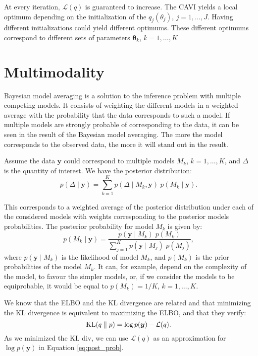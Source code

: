 \documentclass{article}
\numberwithin{equation}{section}
\DeclareMathOperator*{\KL}{{\rm KL}}
\begin{document}
At every iteration, $\mathcal{L}(q)$ is guaranteed to increase. The CAVI yields a local optimum depending on the initialization of the $q_j(\theta_j)$, $j=1,\ldots,J$. Having different initializations could yield different optimums. These different optimums correspond to different sets of parameters $\boldsymbol{\theta}_k$, $k=1,\ldots,K$

\section{Multimodality}

Bayesian model averaging is a solution to the inference problem with multiple competing models. It consists of weighting the different models in a weighted average with the probability that the data corresponds to such a model. If multiple models are strongly probable of corresponding to the data, it can be seen in the result of the Bayesian model averaging. The more the model corresponds to the observed data, the more it will stand out in the result.

Assume the data $\boldsymbol{y}$ could correspond to multiple models $M_k$, $k= 1,\ldots,K$, and $\Delta$ is the quantity of interest. We have the posterior distribution:
\begin{equation}
p(\Delta \mid \boldsymbol{y}) = \sum_{k=1}^K p(\Delta \mid M_k,\boldsymbol{y}) \; p(M_k \mid \boldsymbol{y}).
\label{eq:post_dist}
\end{equation}

This corresponds to a weighted average of the posterior distribution under each of the considered models with weights corresponding to the posterior models probabilities. The posterior probability for model $M_k$ is given by:
\begin{equation}
p(M_k \mid \boldsymbol{y}) = \frac{p(\boldsymbol{y} \mid M_k)\; p(M_k)}{\sum_{j=1}^K p(\boldsymbol{y} \mid M_j)\; p(M_j)},
\label{eq:post_prob}
\end{equation}
where $p(\boldsymbol{y} \mid M_k)$ is the likelihood of model $M_k$, and $p(M_k)$ is the prior probabilities of the model $M_k$. It can, for example, depend on the complexity of the model, to favour the simpler models, or, if we consider the models to be equiprobable, it would be equal to $p(M_k) = 1/K$, $k = 1,\ldots,K$.  

We know that the \small{ELBO} and the KL divergence are related and that minimizing the KL divergence is equivalent to maximizing the \small{ELBO}, and that they verify: 
\begin{equation*}
\KL(q\parallel p) = \log p (\boldsymbol{y}) - \mathcal{L}(q).
\end{equation*}
As we minimized the KL div, we can use $\mathcal{L}(q)$ as an approximation for $\log p(\boldsymbol{y})$ in Equation \ref{eq:post_prob}.
\end{document}
